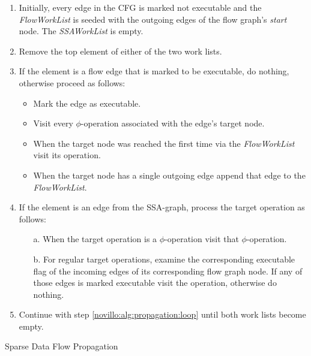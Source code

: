 \begin{algorithm}[t!]
  \begin{enumerate}
    \item Initially, every edge in the CFG is marked not executable and the
          \emph{FlowWorkList} is seeded with the outgoing edges of the flow
          graph's \emph{start} node.  The \emph{SSAWorkList} is empty.
    \item \label{novillo:alg:propagation:loop} Remove the top element of either
          of the two work lists.
    \item \label{novillo:alg:propagation:flowedge} If the element is a flow edge
          that is marked to be executable, do nothing, \\ otherwise proceed as
          follows:
          \begin{itemize}
            \item Mark the edge as executable.
            \item Visit every $\phi$-operation associated with the edge's target
                  node.
            \item When the target node was reached the first time via the
                  \emph{FlowWorkList} visit its operation.
            \item When the target node has a single outgoing edge append that
                  edge to the \emph{FlowWorkList}.
          \end{itemize}
    \item \label{novillo:alg:propagation:ssaedge} If the element is an edge from
          the SSA-graph, process the target operation as follows:
          \begin{enumerate}
            \item[a.] When the target operation is a $\phi$-operation visit that
                      $\phi$-operation.
            \item[b.] \label{novillo:alg:propagation:ssaedge:regular} For
                      regular target operations, examine the corresponding
                      executable flag of the incoming edges of its corresponding
                      flow graph node. If any of those edges is marked
                      executable visit the operation, otherwise do nothing.
          \end{enumerate}
    \item Continue with step \ref{novillo:alg:propagation:loop} until both work
          lists become empty.
    \vspace{-1em}
  \end{enumerate}

  \caption{Sparse Data Flow Propagation}
  \label{novillo:alg:propagation}
\end{algorithm}

